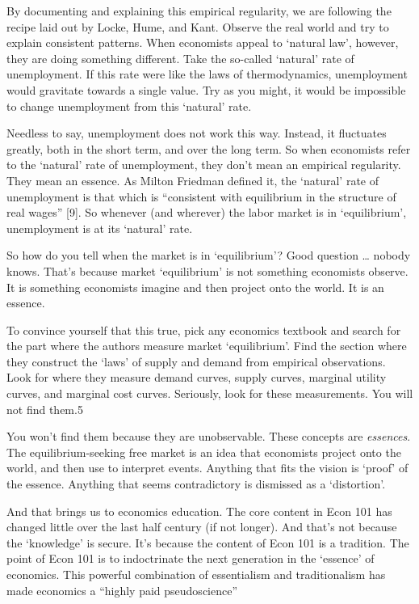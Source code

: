 \documentclass[
]{book}
\begin{document}
By documenting and explaining this empirical regularity, we are following the recipe laid out by Locke, Hume, and Kant. Observe the real world and try to explain consistent patterns. When economists appeal to `natural law', however, they are doing something different. Take the so-called `natural' rate of unemployment. If this rate were like the laws of thermodynamics, unemployment would gravitate towards a single value. Try as you might, it would be impossible to change unemployment from this `natural' rate.

Needless to say, unemployment does not work this way. Instead, it fluctuates greatly, both in the short term, and over the long term. So when economists refer to the `natural' rate of unemployment, they don't mean an empirical regularity. They mean an essence. As Milton Friedman defined it, the `natural' rate of unemployment is that which is ``consistent with equilibrium in the structure of real wages'' {[}9{]}. So whenever (and wherever) the labor market is in `equilibrium', unemployment is at its `natural' rate.

So how do you tell when the market is in `equilibrium'? Good question \ldots{} nobody knows. That's because market `equilibrium' is not something economists observe. It is something economists imagine and then project onto the world. It is an essence.

To convince yourself that this true, pick any economics textbook and search for the part where the authors measure market `equilibrium'. Find the section where they construct the `laws' of supply and demand from empirical observations. Look for where they measure demand curves, supply curves, marginal utility curves, and marginal cost curves. Seriously, look for these measurements. You will not find them.5

You won't find them because they are unobservable. These concepts are \emph{essences}. The equilibrium-seeking free market is an idea that economists project onto the world, and then use to interpret events. Anything that fits the vision is `proof' of the essence. Anything that seems contradictory is dismissed as a `distortion'.

And that brings us to economics education. The core content in Econ 101 has changed little over the last half century (if not longer). And that's not because the `knowledge' is secure. It's because the content of Econ 101 is a tradition. The point of Econ 101 is to indoctrinate the next generation in the `essence' of economics. This powerful combination of essentialism and traditionalism has made economics a ``highly paid pseudoscience''
\end{document}
